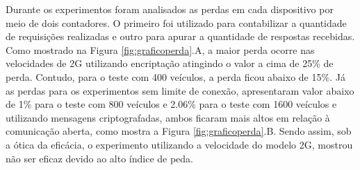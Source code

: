 \documentclass[
	12pt,				%
	oneside,			%
	a4paper,			%
	english,			%
	brazil				%
	]{abntex2ppgsi}
\begin{document}
Durante os experimentos foram analisados as perdas em cada dispositivo por meio de dois contadores. O primeiro foi utilizado para contabilizar a quantidade de requisições realizadas  e outro para apurar a quantidade de respostas recebidas. Como mostrado na Figura \ref{fig:graficoperda}.A, a maior perda ocorre nas velocidades de 2G utilizando encriptação atingindo o valor a cima de 25\% de perda. Contudo, para o teste com 400 veículos, a perda ficou abaixo de 15\%. Já as perdas para os experimentos  sem limite de conexão, apresentaram valor abaixo de 1\% para o teste com 800 veículos e 2.06\% para o teste com 1600 veículos e utilizando mensagens criptografadas, ambos ficaram mais altos em relação à comunicação aberta, como mostra a Figura \ref{fig:graficoperda}.B.  Sendo assim, sob a ótica da eficácia, o experimento utilizando a velocidade do modelo 2G, mostrou não ser eficaz devido ao alto índice de peda.







\end{document}
